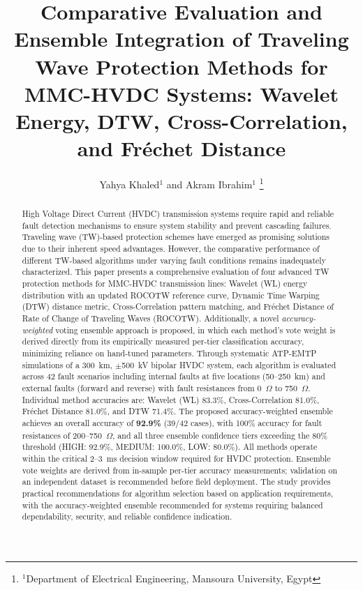 \documentclass[journal]{IEEEtran}
\begin{document}
\title{Comparative Evaluation and Ensemble Integration of Traveling Wave Protection Methods for MMC-HVDC Systems: Wavelet Energy, DTW, Cross-Correlation, and Fr\'{e}chet Distance}

\author{Yahya Khaled$^{1}$ and Akram Ibrahim$^{1}$
\thanks{$^{1}$Department of Electrical Engineering, Mansoura University, Egypt}%
}

\maketitle
{}

\begin{abstract}
High Voltage Direct Current (HVDC) transmission systems require rapid
and reliable fault detection mechanisms to ensure system stability and
prevent cascading failures. Traveling wave (TW)-based protection schemes
have emerged as promising solutions due to their inherent speed
advantages. However, the comparative performance of different TW-based
algorithms under varying fault conditions remains inadequately
characterized. This paper presents a comprehensive evaluation of four
advanced TW protection methods for MMC-HVDC transmission lines: Wavelet
(WL) energy distribution with an updated ROCOTW reference curve, Dynamic
Time Warping (DTW) distance metric, Cross-Correlation pattern matching,
and Fr\'{e}chet Distance of Rate of Change of Traveling Waves (ROCOTW).
Additionally, a novel \emph{accuracy-weighted} voting ensemble approach
is proposed, in which each method's vote weight is derived directly from
its empirically measured per-tier classification accuracy, minimizing
reliance on hand-tuned parameters. Through systematic ATP-EMTP simulations of a
300~km, $\pm$500~kV bipolar HVDC system, each algorithm is evaluated
across 42 fault scenarios including internal faults at five locations
(50--250~km) and external faults (forward and reverse) with fault
resistances from 0~$\Omega$ to 750~$\Omega$. Individual method
accuracies are: Wavelet (WL) 83.3\%, Cross-Correlation 81.0\%,
Fr\'{e}chet Distance 81.0\%, and DTW 71.4\%. The proposed accuracy-weighted ensemble achieves an overall accuracy of
\textbf{92.9\%} (39/42 cases), with 100\% accuracy for fault
resistances of 200--750~$\Omega$, and all three ensemble confidence
tiers exceeding the 80\% threshold (HIGH: 92.9\%, MEDIUM: 100.0\%,
LOW: 80.0\%). All methods operate within the critical 2--3~ms decision
window required for HVDC protection. Ensemble vote weights are derived
from in-sample per-tier accuracy measurements; validation on an
independent dataset is recommended before field deployment. The study
provides practical recommendations for algorithm selection based on
application requirements, with the accuracy-weighted ensemble recommended
for systems requiring balanced dependability, security, and reliable
confidence indication.
\end{abstract}
\end{document}

